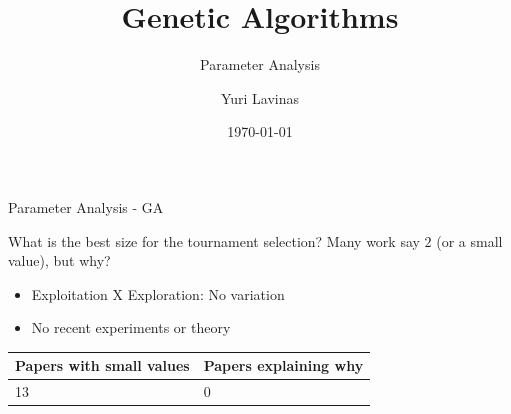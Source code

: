 \documentclass[10pt]{beamer}
\title{Genetic Algorithms}
\subtitle{Parameter Analysis}
\date{\today}
\author{Yuri Lavinas}
\institute{University of Tsukuba}
\begin{document}
\maketitle



\begin{frame}{Parameter Analysis - GA}
	\begin{alertblock}{What is the best size for the tournament selection?}	
		Many work say $2$ (or a small value), but why?
	\end{alertblock}
	\begin{itemize}
		\item Exploitation X Exploration: No variation
		\item No recent experiments or theory
	\end{itemize}

	\begin{table}
		\begin{tabular}{|l|l|}
			\hline
			Papers with small values  & Papers	 explaining why \\ \hline
			13                                              & 0                                    \\ \hline
		\end{tabular}
	\end{table}
\end{frame}
\end{document}
